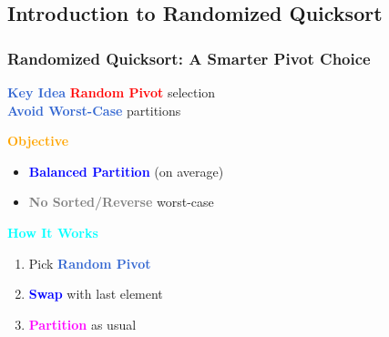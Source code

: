 \documentclass{beamer}
\begin{document}
\subsection{Introduction to Randomized Quicksort}
\begin{frame}
    \frametitle{{Randomized Quicksort: A Smarter Pivot Choice}}

    \begin{block}{\textbf{\textcolor{highlight}{Key Idea}}}
        \textbf{\textcolor{red}{Random Pivot}} selection \\
        \textbf{\textcolor{highlight}{Avoid Worst-Case}} partitions
    \end{block}

    \vspace{0.3cm}
    \begin{block}{\textbf{\textcolor{orange}{Objective}}}
        \begin{itemize}
            \item \textbf{\textcolor{blue}{Balanced Partition}} (on average)
            \item \textbf{\textcolor{gray}{No Sorted/Reverse}} worst-case
        \end{itemize}
    \end{block}

    \vspace{0.3cm}
    \begin{exampleblock}{\textbf{\textcolor{cyan}{How It Works}}}
        \begin{enumerate}
            \item Pick \textbf{\textcolor{highlight}{Random Pivot}}
            \item \textbf{\textcolor{blue}{Swap}} with last element
            \item \textbf{\textcolor{magenta}{Partition}} as usual
        \end{enumerate}
    \end{exampleblock}

\end{frame}
\end{document}
